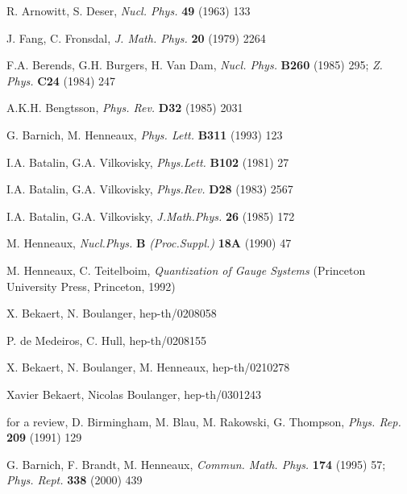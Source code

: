 \documentclass[a4paper,11pt]{article}
\begin{document}
\begin{thebibliography}{99}
  R. Arnowitt, S. Deser, \textit{Nucl. Phys.} \textbf{49}
(1963) 133

  J. Fang, C. Fronsdal, \textit{J. Math. Phys.} \textbf{20}
(1979) 2264

  F.A. Berends, G.H. Burgers, H. Van Dam, \textit{Nucl. Phys.}
\textbf{B260} (1985) 295; \textit{Z. Phys.} \textbf{C24} (1984) 247

  A.K.H. Bengtsson, \textit{Phys. Rev.} \textbf{D32} (1985)
2031

  G. Barnich, M. Henneaux, \textit{Phys. Lett.} \textbf{B311}
(1993) 123

  I.A. Batalin, G.A. Vilkovisky, \textit{Phys.Lett.} \textbf{B102}
(1981) 27

  I.A. Batalin, G.A. Vilkovisky, \textit{Phys.Rev.} \textbf{D28}
(1983) 2567

  I.A. Batalin, G.A. Vilkovisky, \textit{J.Math.Phys.} \textbf{26}
(1985) 172

  M. Henneaux, \textit{Nucl.Phys.} \textbf{B } \textit{%
(Proc.Suppl.)} \textbf{18A} (1990) 47

  M. Henneaux, C. Teitelboim, \textit{Quantization of Gauge
Systems} (Princeton University Press, Princeton, 1992)

  X. Bekaert, N. Boulanger, hep-th/0208058

  P. de Medeiros, C. Hull, hep-th/0208155

  X. Bekaert, N. Boulanger, M. Henneaux, hep-th/0210278

  Xavier Bekaert, Nicolas Boulanger, hep-th/0301243

  for a review, D. Birmingham, M. Blau, M. Rakowski, G.
Thompson, \textit{Phys. Rep.} \textbf{209} (1991) 129

  G. Barnich, F. Brandt, M. Henneaux, \textit{Commun. Math.
Phys.} \textbf{174} (1995) 57; \textit{Phys. Rept.} \textbf{338} (2000) 439
\end{thebibliography}
\end{document}
